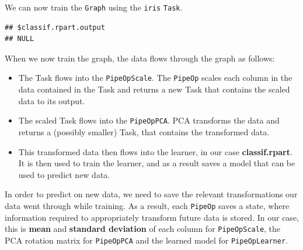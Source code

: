 \documentclass[
]{scrbook}
\newenvironment{Shaded}{\begin{snugshade}}{\end{snugshade}}
\newcommand{\CommentTok}[1]{\textcolor[rgb]{0.56,0.35,0.01}{\textit{#1}}}
\newcommand{\FunctionTok}[1]{\textcolor[rgb]{0.00,0.00,0.00}{#1}}
\newcommand{\NormalTok}[1]{#1}
\newcommand{\OtherTok}[1]{\textcolor[rgb]{0.56,0.35,0.01}{#1}}
\newcommand{\SpecialCharTok}[1]{\textcolor[rgb]{0.00,0.00,0.00}{#1}}
\providecommand{\tightlist}{%
  \setlength{\itemsep}{0pt}\setlength{\parskip}{0pt}}
\renewenvironment{Shaded} {\begin{snugshade}\small} {\end{snugshade}}
\begin{document}
We can now train the \texttt{Graph} using the \texttt{iris} \texttt{Task}.

\begin{Shaded}
\end{Shaded}

\begin{verbatim}
## $classif.rpart.output
## NULL
\end{verbatim}

When we now train the graph, the data flows through the graph as follows:

\begin{itemize}
\tightlist
\item
  The Task flows into the \texttt{PipeOpScale}.
  The \texttt{PipeOp} scales each column in the data contained in the Task and returns a new Task that contains the scaled data to its output.
\item
  The scaled Task flows into the \texttt{PipeOpPCA}.
  PCA transforms the data and returns a (possibly smaller) Task, that contains the transformed data.
\item
  This transformed data then flows into the learner, in our case \textbf{classif.rpart}.
  It is then used to train the learner, and as a result saves a model that can be used to predict new data.
\end{itemize}

In order to predict on new data, we need to save the relevant transformations our data went through while training.
As a result, each \texttt{PipeOp} saves a state, where information required to appropriately transform future data is stored.
In our case, this is \textbf{mean} and \textbf{standard deviation} of each column for \texttt{PipeOpScale}, the PCA rotation matrix for \texttt{PipeOpPCA} and the learned model for \texttt{PipeOpLearner}.

\begin{Shaded}
\end{Shaded}
\end{document}
